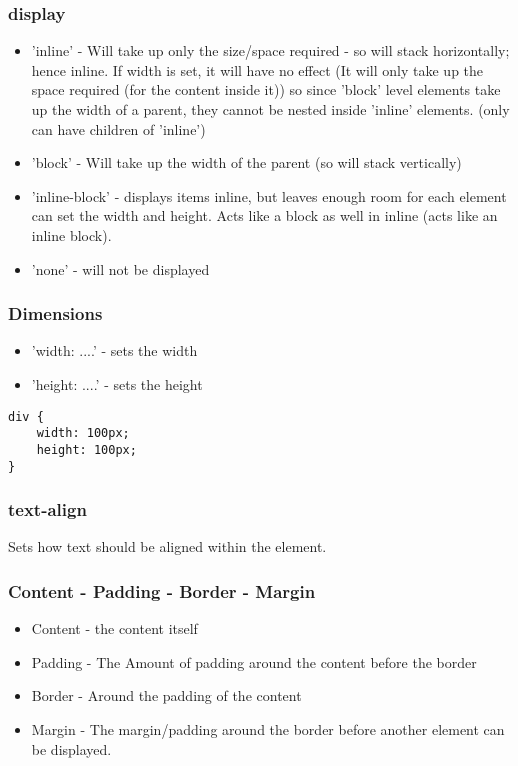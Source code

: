 \documentclass[]{article}
\newcommand{\<}{\guilsinglleft}
\renewcommand{\>}{\guilsinglright}
\begin{document}
\subsubsection{display}
\begin{itemize}
	\item 'inline' - Will take up only the size/space required - so will stack horizontally; hence inline.
	\subitem If width is set, it will have no effect (It will only take up the space required (for the content inside it))
	\subitem so since 'block' level elements take up the width of a parent, they cannot be nested inside 'inline' elements.  (only can have children of 'inline')
	
	\item 'block' - Will take up the width of the parent (so will stack vertically)
	
	\item 'inline-block' - displays items inline, but leaves enough room for each element
	\subitem can set the width and height.
	\subitem Acts like a block as well in inline (acts like an inline block).
	
	\item 'none' - will not be displayed
\end{itemize}

\subsubsection{Dimensions}
\begin{itemize}
	\item 'width: ....' - sets the width 
	\item 'height: ....' - sets the height 
\end{itemize}
\begin{lstlisting}
div {
	width: 100px;
	height: 100px;
}
\end{lstlisting}

\subsubsection{text-align}
Sets how text should be aligned within the element.

\subsubsection{Content - Padding - Border - Margin}
\begin{itemize}
	\item Content - the content itself
	\item Padding - The Amount of padding around the content before the border
	\item Border - Around the padding of the content
	\item Margin - The margin/padding around the border before another element can be displayed.
\end{itemize}
\end{document}
